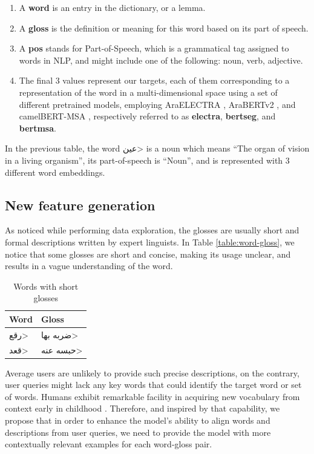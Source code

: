 \documentclass[12.5pt]{article}
\begin{document}
\begin{enumerate}
    \item A \textbf{word} is an entry in the dictionary, or a lemma.
    \item A \textbf{gloss} is the definition or meaning for this word based on its part of speech.
    \item A \textbf{pos} stands for Part-of-Speech, which is a grammatical tag assigned to words in NLP, and might include one of the following: noun, verb, adjective.
    \item The final 3 values represent our targets, each of them corresponding to a representation of the word in a multi-dimensional space using a set of different pretrained models, employing AraELECTRA \cite{Antoun2020-araELECTRA}, AraBERTv2 \cite{Antoun2020-araBERT}, and camelBERT-MSA \cite{inoue2021}, respectively referred to as \textbf{electra}, \textbf{bertseg}, and \textbf{bertmsa}.
\end{enumerate}

In the previous table, the word \<عين> is a noun which means “The organ of vision in a living organism”, its part-of-speech is “Noun”, and is represented with 3 different word embeddings.

\subsection{New feature generation}

As noticed while performing data exploration, the glosses are usually short and formal descriptions written by expert linguists. In Table \ref{table:word-gloss}, we notice that some glosses are short and concise, making its usage unclear, and results in a vague understanding of the word.

\begin{table}[H]
    \centering
    \caption{Words with short glosses}
    \label{table:word-short-gloss}
    \renewcommand{\arraystretch}{1.5}%
    \begin{tabularx}{\textwidth}{|X|X|}
        \hline
        \textbf{Word} & \textbf{Gloss} \\
        \hline
        \<رقع> & \<ضربه بها> \\
        \hline
        \<قعد> & \<حبسه عنه> \\
        \hline
    \end{tabularx}
\end{table}

Average users are unlikely to provide such precise descriptions, on the contrary, user queries might lack any key words that could identify the target word or set of words. Humans exhibit remarkable facility in acquiring new vocabulary from context early in childhood \cite{killian1995}. Therefore, and inspired by that capability, we propose that in order to enhance the model’s ability to align words and descriptions from user queries, we need to provide the model with more contextually relevant examples for each word-gloss pair.
\end{document}
